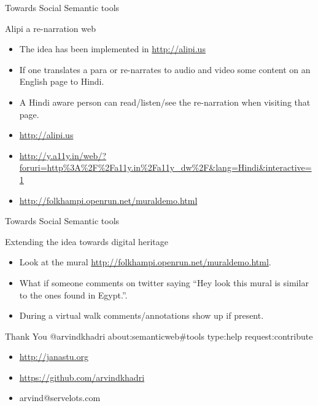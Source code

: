 \documentclass[''urlcolor=red'']{beamer}
\begin{document}
\begin{frame}{Towards Social Semantic tools}
  \begin{block}{Alipi a re-narration web}
    \begin{itemize}
    \item The idea has been implemented in \url{http://alipi.us}
    \item If one translates a para or re-narrates to audio and video some content on an English page to Hindi.
    \item A Hindi aware person can read/listen/see the re-narration when visiting that page.
    \item \url{http://alipi.us}
    \item \url{http://y.a11y.in/web/?foruri=http\%3A\%2F\%2Fa11y.in\%2Fa11y_dw\%2F&lang=Hindi&interactive=1}
    \item \url{http://folkhampi.openrun.net/muraldemo.html}
    \end{itemize}
 \end{block}
\end{frame}

\begin{frame}{Towards Social Semantic tools}
  \begin{block}{Extending the idea towards digital heritage}
    \begin{itemize}
    \item Look at the mural \url{http://folkhampi.openrun.net/muraldemo.html}.
    \item What if someone comments on twitter saying ``Hey look this mural is similar to the ones found in Egypt.''.
    \item During a virtual walk comments/annotations show up if present.
    \end{itemize}
  \end{block}
\end{frame}

\begin{frame}{Thank You}
  \center @arvindkhadri about:semanticweb\#tools type:help request:contribute
  \begin{itemize}
  \item \url{http://janastu.org}
  \item \url{https://github.com/arvindkhadri}
  \item arvind@servelots.com
  \end{itemize}
  
\end{frame}
\end{document}
